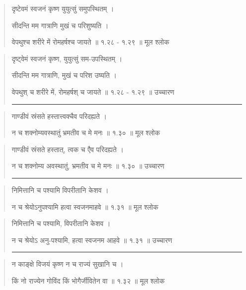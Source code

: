 \begin{quotation} 


दृष्टेवमं स्वजनं कृष्ण युयुत्सुं समुपस्थितम्‌  ।  

सीदन्ति मम गात्राणि मुखं च परिशुष्यति  । 
 
वेपथुश्च शरीरे में रोमहर्षश्च जायते  ॥ १.२८ - १.२९ ॥  मूल श्लोक
\end{quotation}

\begin{quotation}

दृष्ट्वेमं स्वजनं कृष्ण, युयुत्सुं सम-उपस्थितम्  ।  

सीदन्ति मम गात्राणि, मुखं च परिश उष्यति  । 

वेपथुश् च शरीरे में, रोमहर्षश् च जायते  ॥ १.२८ - १.२९ ॥  उच्चारण

\noindent\rule{16cm}{0.4pt} 
\end{quotation}


\begin{quotation} 

गाण्डीवं स्रंसते हस्तात्त्वक्चैव परिदह्यते  ।  
 
न च शक्नोम्यवस्थातुं भ्रमतीव च मे मनः  ॥ १.३० ॥  मूल श्लोक
\end{quotation}

\begin{quotation} 

गाण्डीवं स्रंसते हस्तात्, त्वक च एैव परिदह्यते  ।  

न च शक्नोम्य अवस्थातुं, भ्रमतीव च मे मनः  ॥ १.३० ॥  उच्चारण

\noindent\rule{16cm}{0.4pt} 
\end{quotation}


\begin{quotation} 

निमित्तानि च पश्यामि विपरीतानि केशव  ।  
 
न च श्रेयोऽनुपश्यामि हत्वा स्वजनमाहवे  ॥ १.३१ ॥  मूल श्लोक
\end{quotation}

\begin{quotation}

निमित्तानि च पश्यामि, विपरीतानि केशव  ।  
 
न च श्रेयोऽ अनु-पश्यामि, हत्वा स्वजनम आहवे  ॥ १.३१ ॥  उच्चारण

\noindent\rule{16cm}{0.4pt} 
\end{quotation}


\begin{quotation} 

न काङ्‍क्षे विजयं कृष्ण न च राज्यं सुखानि च  ।  
 
किं नो राज्येन गोविंद किं भोगैर्जीवितेन वा  ॥ १.३२ ॥  मूल श्लोक
\end{quotation}

